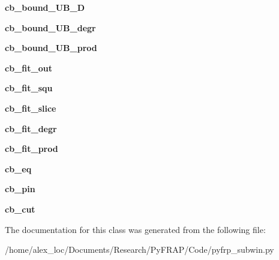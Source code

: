 \begin{DoxyCompactItemize}
\item 
\hypertarget{classpyfrp__subwin_1_1fit__dialog_a60469346c1d8eec1b20e749dab3862a9}{{\bfseries cb\+\_\+bound\+\_\+\+U\+B\+\_\+\+D}}\label{classpyfrp__subwin_1_1fit__dialog_a60469346c1d8eec1b20e749dab3862a9}

\item 
\hypertarget{classpyfrp__subwin_1_1fit__dialog_a8c9e2124079839769e98f33b14742c53}{{\bfseries cb\+\_\+bound\+\_\+\+U\+B\+\_\+degr}}\label{classpyfrp__subwin_1_1fit__dialog_a8c9e2124079839769e98f33b14742c53}

\item 
\hypertarget{classpyfrp__subwin_1_1fit__dialog_a1f3f42b0507c95b64c8e929b23f6fe21}{{\bfseries cb\+\_\+bound\+\_\+\+U\+B\+\_\+prod}}\label{classpyfrp__subwin_1_1fit__dialog_a1f3f42b0507c95b64c8e929b23f6fe21}

\item 
\hypertarget{classpyfrp__subwin_1_1fit__dialog_a8d6de17695c760a42fd1912152820aa8}{{\bfseries cb\+\_\+fit\+\_\+out}}\label{classpyfrp__subwin_1_1fit__dialog_a8d6de17695c760a42fd1912152820aa8}

\item 
\hypertarget{classpyfrp__subwin_1_1fit__dialog_a3d00c6a874ab4652cfa1a2d56dfbba83}{{\bfseries cb\+\_\+fit\+\_\+squ}}\label{classpyfrp__subwin_1_1fit__dialog_a3d00c6a874ab4652cfa1a2d56dfbba83}

\item 
\hypertarget{classpyfrp__subwin_1_1fit__dialog_a7faaba7677d88bb403101e21f56bad4f}{{\bfseries cb\+\_\+fit\+\_\+slice}}\label{classpyfrp__subwin_1_1fit__dialog_a7faaba7677d88bb403101e21f56bad4f}

\item 
\hypertarget{classpyfrp__subwin_1_1fit__dialog_a06b3d8c92bc078aecb93328b067b883e}{{\bfseries cb\+\_\+fit\+\_\+degr}}\label{classpyfrp__subwin_1_1fit__dialog_a06b3d8c92bc078aecb93328b067b883e}

\item 
\hypertarget{classpyfrp__subwin_1_1fit__dialog_a7dd08dbb140a9a3c0915d8e8057310bf}{{\bfseries cb\+\_\+fit\+\_\+prod}}\label{classpyfrp__subwin_1_1fit__dialog_a7dd08dbb140a9a3c0915d8e8057310bf}

\item 
\hypertarget{classpyfrp__subwin_1_1fit__dialog_a2a2a09f9c39434d7c99a21980c94698e}{{\bfseries cb\+\_\+eq}}\label{classpyfrp__subwin_1_1fit__dialog_a2a2a09f9c39434d7c99a21980c94698e}

\item 
\hypertarget{classpyfrp__subwin_1_1fit__dialog_ac900e3e8b95ba5d2f754bfd5eda65bd5}{{\bfseries cb\+\_\+pin}}\label{classpyfrp__subwin_1_1fit__dialog_ac900e3e8b95ba5d2f754bfd5eda65bd5}

\item 
\hypertarget{classpyfrp__subwin_1_1fit__dialog_abe458adcbada5750879ae75a0c8a41a2}{{\bfseries cb\+\_\+cut}}\label{classpyfrp__subwin_1_1fit__dialog_abe458adcbada5750879ae75a0c8a41a2}

\end{DoxyCompactItemize}


The documentation for this class was generated from the following file\+:\begin{DoxyCompactItemize}
\item 
/home/alex\+\_\+loc/\+Documents/\+Research/\+Py\+F\+R\+A\+P/\+Code/pyfrp\+\_\+subwin.\+py\end{DoxyCompactItemize}

